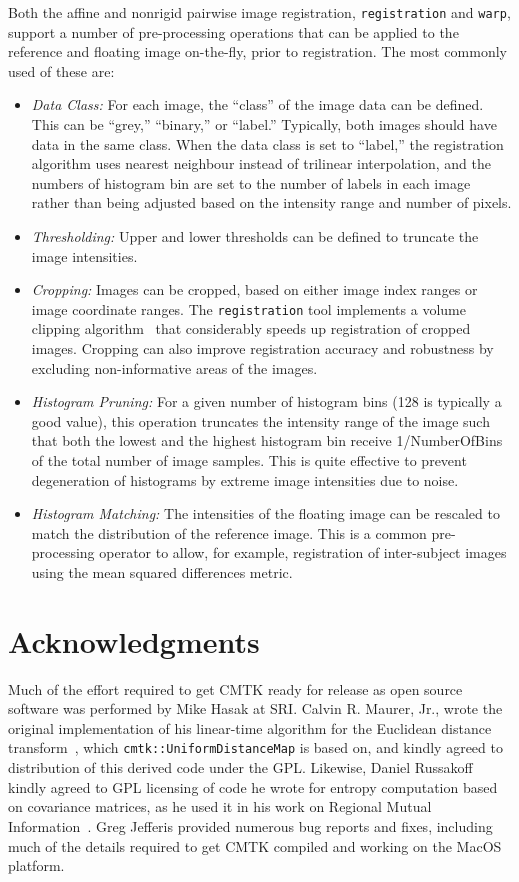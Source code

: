 \documentclass{InsightArticle}
\begin{document}
Both the affine and nonrigid pairwise image registration, \verb|registration|
and \verb|warp|, support a number of pre-processing operations that can be
applied to the reference and floating image on-the-fly, prior to
registration. The most commonly used of these are:
\begin{itemize}
\item {\em Data Class:\/} For each image, the ``class'' of the image data can
  be defined. This can be ``grey,'' ``binary,'' or ``label.'' Typically, both
  images should have data in the same class. When the data class is set to
  ``label,'' the registration algorithm uses nearest neighbour instead of
  trilinear interpolation, and the numbers of histogram bin are set to the
  number of labels in each image rather than being adjusted based on the
  intensity range and number of pixels.
\item {\em Thresholding:\/} Upper and lower thresholds can be defined to
  truncate the image intensities.
\item {\em Cropping:\/} Images can be cropped, based on either image index
  ranges or image coordinate ranges. The \verb|registration| tool implements a
  volume clipping algorithm~\cite{Rohlfing:2003} that considerably speeds up
  registration of cropped images. Cropping can also improve registration
  accuracy and robustness by excluding non-informative areas of the images.
\item {\em Histogram Pruning:\/} For a given number of histogram bins (128 is
  typically a good value), this operation truncates the intensity range of the
  image such that both the lowest and the highest histogram bin receive
  1/NumberOfBins of the total number of image samples. This is quite effective
  to prevent degeneration of histograms by extreme image intensities due to
  noise.
\item {\em Histogram Matching:\/} The intensities of the floating image can be
  rescaled to match the distribution of the reference image. This is a common
  pre-processing operator to allow, for example, registration of inter-subject
  images using the mean squared differences metric.
\end{itemize}

\section*{Acknowledgments}

Much of the effort required to get CMTK ready for release as open source
software was performed by Mike Hasak at SRI. Calvin R. Maurer, Jr., wrote the
original implementation of his linear-time algorithm for the Euclidean
distance transform~\cite{MaurQiRagh:2003}, which
\verb|cmtk::UniformDistanceMap| is based on, and kindly agreed to distribution
of this derived code under the GPL. Likewise, Daniel Russakoff kindly agreed
to GPL licensing of code he wrote for entropy computation based on covariance
matrices, as he used it in his work on Regional Mutual
Information~\cite{RussTomaRohl:2004}. Greg Jefferis provided numerous bug
reports and fixes, including much of the details required to get CMTK compiled
and working on the MacOS platform.

%
%



\end{document}

